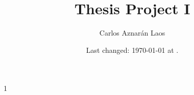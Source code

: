 \usepackage{mathtools}
\usepackage[ISO]{diffcoeff}
\usepackage[useregional]{datetime2}
\usepackage[
]{biblatex}


\providecommand{\continuous}{C\left(\interval\right)}
\providecommand{\interval}{\left[a,b\right]}
\providecommand{\openinterval}{\left(a,b\right)}
\providecommand{\nodalset}{X={\left\{x_{i}\right\}}_{i=0}^{n}}
\providecommand{\concentration}{u\left(x,t\right)}
\providecommand{\averageconcentration}{\overline{u}\left(x,t\right)}








\author{Carlos Aznarán Laos}
\title{Thesis Project I}

\def\Book{1}
\Book
\else
\fi

\date{
    Last changed: \today{} at \DTMcurrenttime.
}